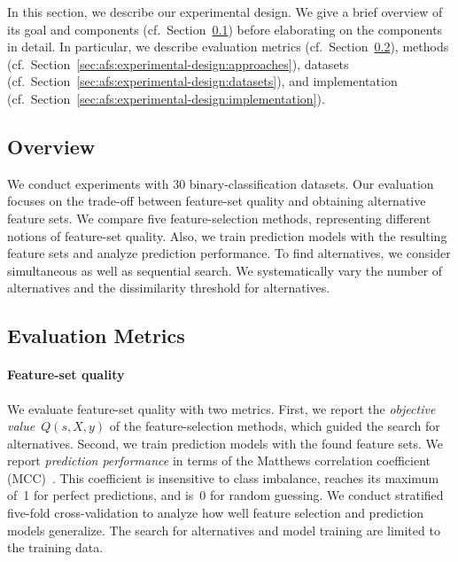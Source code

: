 \documentclass{article}
\theoremstyle{definition}
\begin{document}
In this section, we describe our experimental design.
We give a brief overview of its goal and components (cf.~Section~\ref{sec:afs:experimental-design:overview}) before elaborating on the components in detail.
In particular, we describe evaluation metrics (cf.~Section~\ref{sec:afs:experimental-design:evaluation}), methods (cf.~Section~\ref{sec:afs:experimental-design:approaches}), datasets (cf.~Section~\ref{sec:afs:experimental-design:datasets}), and implementation (cf.~Section~\ref{sec:afs:experimental-design:implementation}).

\subsection{Overview}
\label{sec:afs:experimental-design:overview}

We conduct experiments with 30 binary-classification datasets.
Our evaluation focuses on the trade-off between feature-set quality and obtaining alternative feature sets.
We compare five feature-selection methods, representing different notions of feature-set quality.
Also, we train prediction models with the resulting feature sets and analyze prediction performance.
To find alternatives, we consider simultaneous as well as sequential search.
We systematically vary the number of alternatives and the dissimilarity threshold for alternatives.

\subsection{Evaluation Metrics}
\label{sec:afs:experimental-design:evaluation}

\paragraph{Feature-set quality}

We evaluate feature-set quality with two metrics.
First, we report the \emph{objective value}~$Q(s,X,y)$ of the feature-selection methods, which guided the search for alternatives.
Second, we train prediction models with the found feature sets.
We report \emph{prediction performance} in terms of the Matthews correlation coefficient (MCC)~\cite{matthews1975comparison}.
This coefficient is insensitive to class imbalance, reaches its maximum of~1 for perfect predictions, and is~0 for random guessing.
We conduct stratified five-fold cross-validation to analyze how well feature selection and prediction models generalize.
The search for alternatives and model training are limited to the training data.
\end{document}
